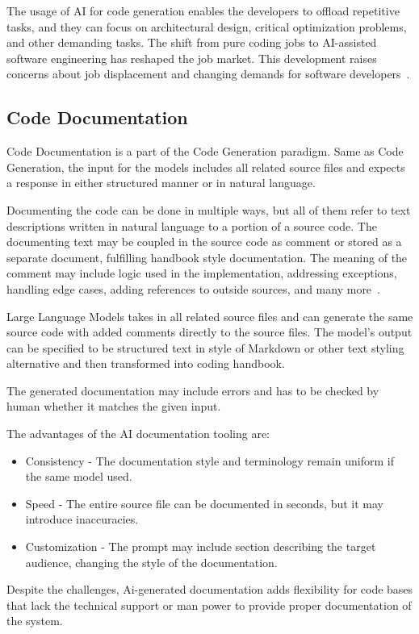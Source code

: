 The usage of AI for code generation enables the developers to offload repetitive tasks, and they can focus on architectural design,
critical optimization problems, and other demanding tasks.
The shift from pure coding jobs to AI-assisted software engineering has reshaped the job market.
This development raises concerns about job displacement and changing demands for software developers~\parencite[Changes in Software Engeneering Job Roles]{khade2025review_of_llm_code}.

\subsection{Code Documentation}\label{subsec:code-documentation}
Code Documentation is a part of the Code Generation paradigm.
Same as Code Generation, the input for the models includes all related source files and expects a response
in either structured manner or in natural language.

Documenting the code can be done in multiple ways, but all of them refer to text descriptions written in natural language to
a portion of a source code.
The documenting text may be coupled in the source code as comment or stored as a separate document,
fulfilling handbook style documentation.
The meaning of the comment may include logic used in the implementation, addressing exceptions, handling edge cases,
adding references to outside sources, and many more~\parencite{zhang2022_code_summarization}.

Large Language Models takes in all related source files and can generate the same source code with added comments
directly to the source files.
The model's output can be specified to be structured text in style of Markdown or other text styling alternative and
then transformed into coding handbook.

The generated documentation may include errors and has to be checked by human whether it matches the given input.

The advantages of the AI documentation tooling are:

\begin{itemize}
    \item Consistency - The documentation style and terminology remain uniform if the same model used.
    \item Speed - The entire source file can be documented in seconds, but it may introduce inaccuracies.
    \item Customization - The prompt may include section describing the target audience, changing the style of the documentation.
\end{itemize}

Despite the challenges, Ai-generated documentation adds flexibility for code bases that lack the technical support
or man power to provide proper documentation of the system.
